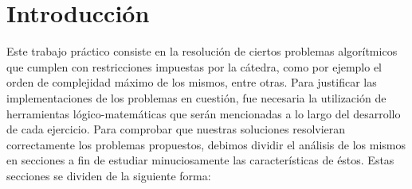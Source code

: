 \documentclass[10pt, a4paper]{article}
\author{Algoritmos y Estructuras de Datos III, DC, UBA.}
\date{}
\title{}
\begin{document}
	
\thispagestyle{empty}
\titulo{}

\maketitle

\tableofcontents
\newpage

\section{Introducci\'on}
Este trabajo práctico consiste en la resolución de ciertos problemas algorítmicos que cumplen con restricciones impuestas por la cátedra, como por ejemplo el orden de complejidad máximo de los mismos, entre otras. Para justificar las implementaciones de los problemas en cuestión, fue necesaria la utilización de herramientas lógico-matemáticas que serán mencionadas a lo largo del desarrollo de cada ejercicio.\newline
Para comprobar que nuestras soluciones resolvieran correctamente los problemas propuestos, debimos dividir el análisis de los mismos en secciones a fin de estudiar minuciosamente las características de éstos. Estas secciones se dividen de la siguiente forma:
\end{document}
